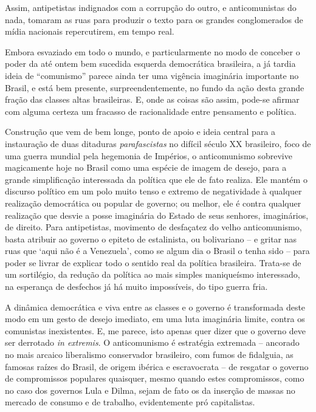 Assim, antipetistas indignados com a corrupção do outro, e
anticomunistas do nada, tomaram as ruas para produzir o texto para os
grandes conglomerados de mídia nacionais repercutirem, em tempo real.

Embora esvaziado em todo o mundo, e particularmente no modo de conceber
o poder da até ontem bem sucedida esquerda democrática brasileira, a já
tardia ideia de ``comunismo'' parece ainda ter uma vigência imaginária
importante no Brasil, e está bem presente, surpreendentemente, no fundo
da ação desta grande fração das classes altas brasileiras. E, onde as
coisas são assim, pode-se afirmar com alguma certeza um fracasso de
racionalidade entre pensamento e política.

Construção que vem de bem longe, ponto de apoio e ideia central para a
instauração de duas ditaduras \emph{parafascistas} no difícil século XX
brasileiro, foco de uma guerra mundial pela hegemonia de Impérios, o
anticomunismo sobrevive magicamente hoje no Brasil como uma espécie de
imagem de desejo, para a grande simplificação interessada da política
que ele de fato realiza. Ele mantém o discurso político em um polo muito
tenso e extremo de negatividade à qualquer realização democrática ou
popular de governo; ou melhor, ele é contra qualquer realização que
desvie a posse imaginária do Estado de seus senhores, imaginários, de
direito. Para antipetistas, movimento de desfaçatez do velho
anticomunismo, basta atribuir ao governo o epiteto de estalinista, ou
bolivariano -- e gritar nas ruas que `aqui não é a Venezuela', como se
algum dia o Brasil o tenha sido -- para poder se livrar de explicar todo
o sentido real da política brasileira. Trata-se de um sortilégio, da
redução da política ao mais simples maniqueísmo interessado, na
esperança de desfechos já há muito impossíveis, do tipo guerra fria.

A dinâmica democrática e viva entre as classes e o governo é
transformada deste modo em um gesto de desejo imediato, em uma luta
imaginária limite, contra os comunistas inexistentes. E, me parece, isto
apenas quer dizer que o governo deve ser derrotado \emph{in extremis}. O
anticomunismo é estratégia extremada -- ancorado no mais arcaico
liberalismo conservador brasileiro, com fumos de fidalguia, as famosas
raízes do Brasil, de origem ibérica e escravocrata -- de resgatar o
governo de compromissos populares quaisquer, mesmo quando estes
compromissos, como no caso dos governos Lula e Dilma, sejam de fato os
da inserção de massas no mercado de consumo e de trabalho, evidentemente
pró capitalistas.

